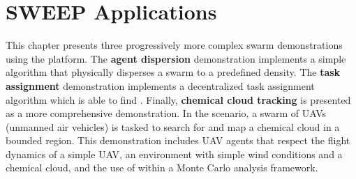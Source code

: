 \chapter{SWEEP Applications}
\label{ch:SweepApplications}

This chapter presents three progressively more complex swarm demonstrations using the \SWEEP{} platform.  The \textbf{agent dispersion} demonstration implements a simple algorithm that physically disperses a swarm to a predefined density.  The \textbf{task assignment} demonstration implements a decentralized task assignment algorithm which is able to find .  Finally, \textbf{chemical cloud tracking} is presented as a more comprehensive demonstration.  In the scenario, a swarm of UAVs (unmanned air vehicles) is tasked to search for and map a chemical cloud in a bounded region.  This demonstration includes UAV agents that respect the flight dynamics of a simple UAV, an environment with simple wind conditions and a chemical cloud, and the use of \SWEEP{} within a Monte Carlo analysis framework.






